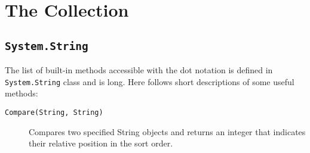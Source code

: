 \chapter{The Collection}

\section{\texttt{System.String}}
\label{sec:system.string}
The list of built-in methods accessible with the dot notation is defined in \lstinline|System.String| class and is long. Here follows short descriptions of some useful methods:
\begin{description}
\item[\texttt{Compare(String, String)}] Compares two specified String objects and returns an integer that indicates their relative position in the sort order.

\end{description}
